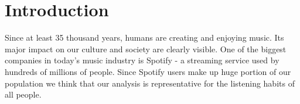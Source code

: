 \section{Introduction}
Since at least 35 thousand years, humans are creating and enjoying music. Its major impact on our culture and society are clearly visible. One of the biggest companies in today's music industry is Spotify - a streaming service used by hundreds of millions of people. Since Spotify users make up huge portion of our population we think that our analysis is representative for the listening habits of all people.